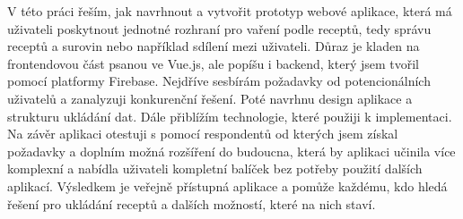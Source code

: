 
V této práci řeším, jak navrhnout a vytvořit prototyp webové aplikace, která má uživateli poskytnout jednotné rozhraní
pro vaření podle receptů, tedy správu receptů a surovin nebo například sdílení mezi uživateli.
Důraz je kladen na frontendovou část psanou ve Vue.js, ale popíšu i backend, který jsem tvořil pomocí platformy Firebase.
Nejdříve sesbírám požadavky od potencionálních uživatelů a zanalyzuji konkurenční řešení. Poté navrhnu design aplikace a
strukturu ukládání dat. Dále přiblížím technologie, které použiji k implementaci.
Na závěr aplikaci otestuji s pomocí respondentů od kterých jsem získal požadavky a doplním možná rozšíření do budoucna,
která by aplikaci učinila více komplexní a nabídla uživateli kompletní balíček bez potřeby použití dalších aplikací.
Výsledkem je veřejně přístupná aplikace a pomůže každému, kdo hledá řešení pro ukládání receptů a dalších možností, které na nich staví.
